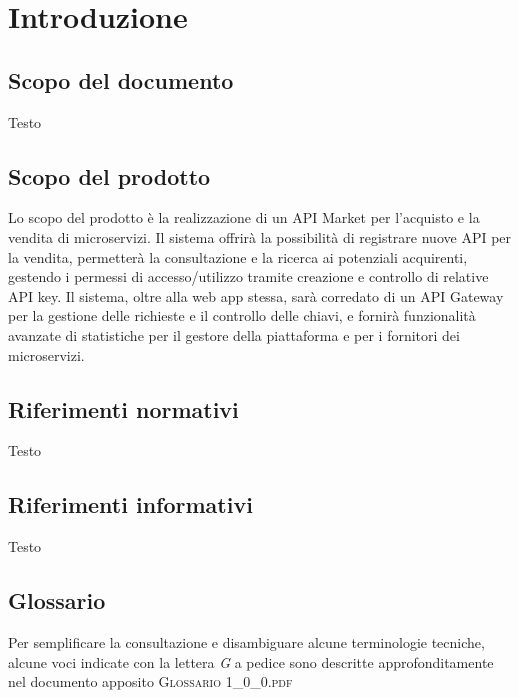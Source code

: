\newpage
\section{Introduzione}

\subsection{Scopo del documento}
Testo
\subsection{Scopo del prodotto}
Lo scopo del prodotto è la realizzazione di un API Market per l'acquisto e la vendita di microservizi. Il sistema offrirà la possibilità di registrare nuove API per la vendita, permetterà la consultazione e la ricerca ai potenziali acquirenti, gestendo i permessi di accesso/utilizzo tramite creazione e controllo di relative API key. Il sistema, oltre alla web app stessa, sarà corredato di un API Gateway per la gestione delle richieste e il controllo delle chiavi, e fornirà funzionalità avanzate di statistiche per il gestore della piattaforma e per i fornitori dei microservizi.

\subsection{Riferimenti normativi}
Testo

\subsection{Riferimenti informativi}
Testo

\subsection{Glossario}
Per semplificare la consultazione e disambiguare alcune terminologie tecniche, alcune voci indicate con la lettera \textit{G} a pedice sono descritte approfonditamente nel documento apposito \textsc{Glossario 1\_0\_0.pdf}